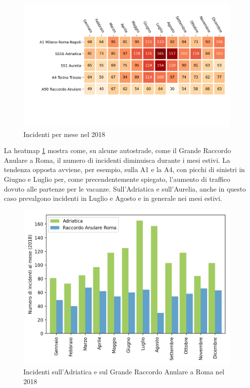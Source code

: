 \documentclass[a4paper]{report}
\begin{document}
\begin{figure}
    \includegraphics[width=\linewidth]{../src/incidenti/incidenti_aci/autostrade/mesi_autostrade.png}
    \caption{Incidenti per mese nel 2018}
    \label{fig:incidenti-per-mese}
\end{figure}

La heatmap \ref{fig:incidenti-per-mese} mostra come, su alcune autostrade, come il 
Grande Raccordo Anulare a Roma, il numero di incidenti diminuisca durante i mesi 
estivi.
La tendenza opposta avviene, per esempio, sulla A1 e la A4, con picchi di 
sinistri in Giugno e Luglio per, come precendentemente spiegato, l'aumento di 
traffico dovuto alle partenze per le vacanze.
Sull'Adriatica e sull'Aurelia, anche in questo caso prevalgono incidenti 
in Luglio e Agosto e in generale nei mesi estivi.

\begin{figure}
    \includegraphics[width=\linewidth]{../src/incidenti/incidenti_aci/autostrade/adriatica_roma.png}
    \caption{Incidenti sull'Adriatica e sul Grande Raccordo Anulare a Roma nel 2018}
    \label{fig:adriatica-roma}
\end{figure}
\end{document}
